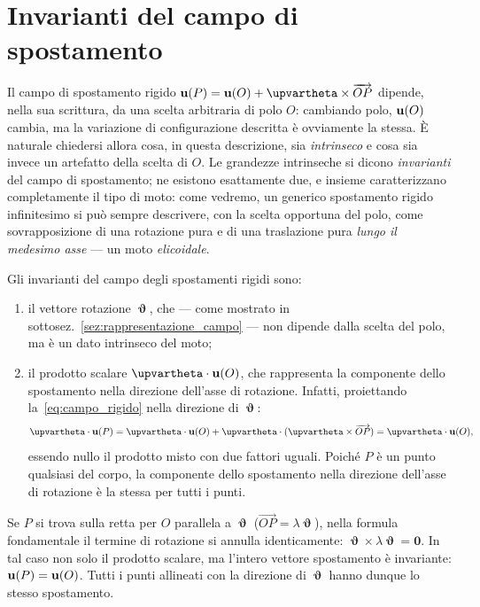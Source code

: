 \section{Invarianti del campo di spostamento}\label{sec:invarianti}
Il campo di spostamento rigido $\ub(P)=\ub(O)+\bm{\upvartheta}\times\overrightarrow{OP}$ dipende, nella sua scrittura, da una scelta arbitraria di polo $O$: cambiando polo, $\mathbf{u}(O)$ cambia, ma la variazione di configurazione descritta è ovviamente la stessa. È naturale chiedersi allora cosa, in questa descrizione, sia \emph{intrinseco}  e cosa sia invece un artefatto della scelta di $O$. Le grandezze intrinseche si dicono \textit{invarianti} del campo di spostamento; ne esistono esattamente due, e insieme caratterizzano completamente il tipo di moto: come vedremo, un generico spostamento rigido infinitesimo si può sempre descrivere, con la scelta opportuna del polo, come sovrapposizione di una rotazione pura e di una traslazione pura \emph{lungo il medesimo asse} — un moto \textit{elicoidale}.

Gli invarianti del campo degli spostamenti rigidi sono:
\begin{enumerate}[label=(\roman*)]
	\item il vettore rotazione $\bm{\upvartheta}$, che — come mostrato in sottosez.~\ref{sez:rappresentazione_campo}  — non dipende dalla scelta del polo, ma è un dato intrinseco del moto;
	\item il prodotto scalare
	$\bm{\upvartheta} \cdot \ub(O)$, che rappresenta la
	componente dello spostamento nella direzione dell'asse di
	rotazione. Infatti, proiettando la~\eqref{eq:campo_rigido} nella
	direzione di $\bm{\upvartheta}$:
	\begin{equation}
		\bm{\upvartheta} \cdot \ub(P)
		= \bm{\upvartheta} \cdot \ub(O)
		+ \bm{\upvartheta} \cdot
		(\bm{\upvartheta} \times \overrightarrow{OP})
		= \bm{\upvartheta} \cdot \ub(O),
	\end{equation}
	essendo nullo il prodotto misto con due fattori uguali.
	Poiché $P$ è un punto qualsiasi del corpo, la componente
	dello spostamento nella direzione dell'asse di rotazione è
	la stessa per tutti i punti.
\end{enumerate}
\begin{oss}
	Se $P$ si trova sulla retta per $O$ parallela a
	$\bm{\upvartheta}$
	($\overrightarrow{OP} = \lambda\bm{\upvartheta}$), nella
	formula fondamentale il termine di rotazione si annulla
	identicamente:
	$\bm{\upvartheta} \times \lambda\bm{\upvartheta} = \mathbf 0$.
	In tal caso non solo il prodotto scalare, ma l'intero
	vettore spostamento è invariante: $\mathbf{u}(P) = \mathbf{u}(O)$. Tutti
	i punti allineati con la direzione di $\bm{\upvartheta}$
	hanno dunque lo stesso spostamento. 
\end{oss}



